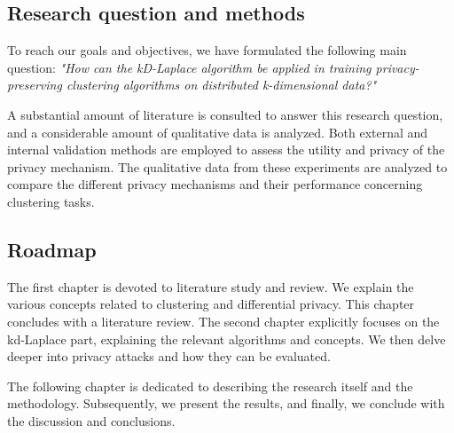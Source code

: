 

\subsection*{Research question and methods}
To reach our goals and objectives, we have formulated the following main question: \newline \newline
\textit{"How can the kD-Laplace algorithm be applied in training privacy-preserving clustering algorithms on distributed k-dimensional data?"} \newline

A substantial amount of literature is consulted to answer this research question, and a considerable amount of qualitative data is analyzed.
Both external and internal validation methods are employed to assess the utility and privacy of the privacy mechanism.
The qualitative data from these experiments are analyzed to compare the different privacy mechanisms and their performance concerning clustering tasks.

\subsection*{Roadmap}
The first chapter is devoted to literature study and review.
We explain the various concepts related to clustering and differential privacy.
This chapter concludes with a literature review.
The second chapter explicitly focuses on the kd-Laplace part, explaining the relevant algorithms and concepts.
We then delve deeper into privacy attacks and how they can be evaluated.

The following chapter is dedicated to describing the research itself and the methodology.
Subsequently, we present the results, and finally, we conclude with the discussion and conclusions.


